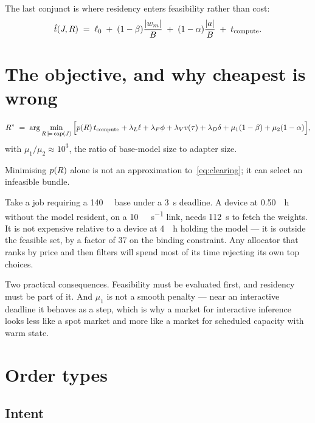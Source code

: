 \documentclass[11pt,a4paper]{article}
\begin{document}
The last conjunct is where residency enters feasibility rather than cost:
\begin{equation}
\hat{t}(J,R) \;=\; \ell_{0}
\;+\; (1-\beta)\frac{|w_{m}|}{B}
\;+\; (1-\alpha)\frac{|a|}{B}
\;+\; t_{\text{compute}} .
\end{equation}

\section{The objective, and why cheapest is wrong}

\begin{equation}
R^{*} \;=\; \arg\min_{R \,\models\, \mathrm{cap}(J)}
\Big[
p(R)\,t_{\text{compute}}
+ \lambda_{L}\ell
+ \lambda_{F}\phi
+ \lambda_{V}v(\tau)
+ \lambda_{D}\delta
+ \mu_{1}(1-\beta)
+ \mu_{2}(1-\alpha)
\Big],
\label{eq:clearing}
\end{equation}
with $\mu_{1}/\mu_{2} \approx 10^{3}$, the ratio of base-model size to adapter
size.

\begin{proposition}
Minimising $p(R)$ alone is not an approximation to~\eqref{eq:clearing}; it
can select an infeasible bundle.
\end{proposition}

Take a job requiring a \SI{140}{\giga\byte} base under a \SI{3}{\second}
deadline. A device at \SI{0.50}{\per\hour} without the model resident, on a
\SI{10}{\giga\bit\per\second} link, needs \SI{112}{\second} to fetch the weights.
It is not expensive relative to a device at \SI{4}{\per\hour} holding the model
--- it is outside the feasible set, by a factor of \num{37} on the binding
constraint. Any allocator that ranks by price and then filters will spend most of
its time rejecting its own top choices.

Two practical consequences. Feasibility must be evaluated first, and residency
must be part of it. And $\mu_{1}$ is not a smooth penalty --- near an interactive
deadline it behaves as a step, which is why a market for interactive inference
looks less like a spot market and more like a market for scheduled capacity with
warm state.

\section{Order types}

\subsection{Intent}
\end{document}
